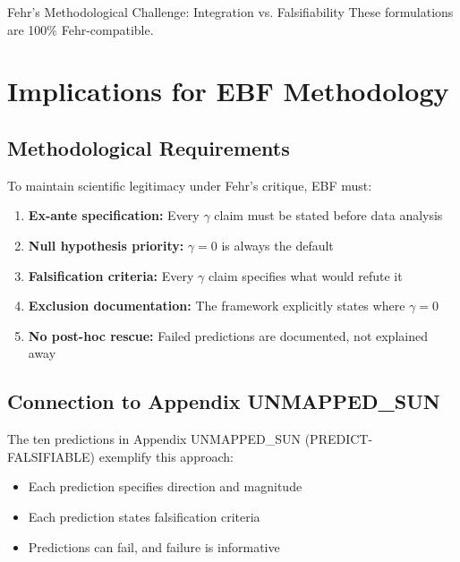 \begin{chapter}{Fehr's Methodological Challenge: Integration vs. Falsifiability}
These formulations are 100\% Fehr-compatible.


\section{Implications for EBF Methodology}
\label{sec:implications}

\subsection{Methodological Requirements}

To maintain scientific legitimacy under Fehr's critique, EBF must:

\begin{enumerate}
    \item \textbf{Ex-ante specification:} Every $\gamma$ claim must be stated before data analysis

    \item \textbf{Null hypothesis priority:} $\gamma = 0$ is always the default

    \item \textbf{Falsification criteria:} Every $\gamma$ claim specifies what would refute it

    \item \textbf{Exclusion documentation:} The framework explicitly states where $\gamma = 0$

    \item \textbf{No post-hoc rescue:} Failed predictions are documented, not explained away
\end{enumerate}

\subsection{Connection to Appendix UNMAPPED_SUN}

The ten predictions in Appendix UNMAPPED_SUN (PREDICT-FALSIFIABLE) exemplify this approach:

\begin{itemize}[noitemsep]
    \item Each prediction specifies direction and magnitude
    \item Each prediction states falsification criteria
    \item Predictions can fail, and failure is informative
\end{itemize}


\end{chapter}
